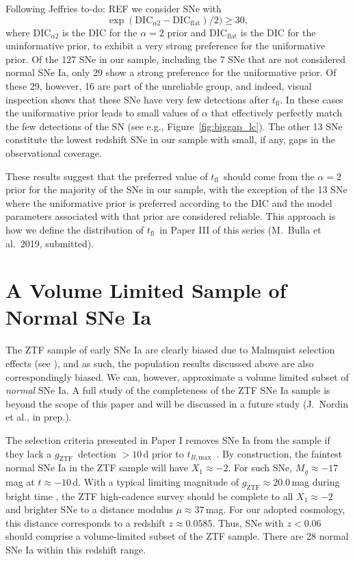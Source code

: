\documentclass[twocolumn]{./aastex63}
\newcommand{\todo}[1]{{\color{magenta} to-do: {#1}}}
\newcommand{\gztf}{$g_\mathrm{ZTF}$}
\newcommand{\tfl}{$t_\mathrm{fl}$}
\newcommand{\tbmax}{$t_{B,\mathrm{max}}$}
\begin{document}
Following Jeffries \todo{REF} we consider SNe with
%
$$\exp(\mathrm{DIC}_{\alpha2} - \mathrm{DIC}_\mathrm{flat})/2) \ge 30,$$
%
where $\mathrm{DIC}_{\alpha2}$ is the DIC for the $\alpha = 2$ prior and
$\mathrm{DIC}_\mathrm{flat}$ is the DIC for the uninformative prior, to
exhibit a very strong preference for the uniformative prior. Of the 127 SNe in
our sample, including the 7 SNe that are not considered normal SNe Ia, only 29
show a strong preference for the uniformative prior. Of these 29, however, 16
are part of the unreliable group, and indeed, visual inspection shows that
these SNe have very few detections after \tfl. In these cases the uniformative
prior leads to small values of $\alpha$ that effectively perfectly match the
few detections of the SN (see e.g., Figure~\ref{fig:biggap_lc}). The other 13
SNe constitute the lowest redshift SNe in our sample with small, if any, gaps
in the observational coverage.

These results suggest that the preferred value of \tfl\ should come from the
$\alpha = 2$ prior for the majority of the SNe in our sample, with the
exception of the 13 SNe where the uniformative prior is preferred according to
the DIC and the model parameters associated with that prior are considered
reliable. This approach is how we define the distribution of \tfl\ in Paper
III of this series (M.~Bulla et al.~2019, submitted).

\section{A Volume Limited Sample of Normal SNe Ia}\label{sec:volume_limited}

The ZTF sample of early SNe Ia are clearly biased due to Malmquist selection
effects (see \citealt{Yao19}), and as such, the population results discussed
above are also correspondingly biased. We can, however, approximate a volume
limited subset of \textit{normal} SNe Ia. A full study of the completeness of
the ZTF SNe Ia sample is beyond the scope of this paper and will be discussed
in a future study (J.~Nordin et al., in prep.).

The selection criteria presented in Paper I removes SNe Ia from the sample if
they lack a \gztf\ detection $> 10$\,d prior to \tbmax\ \citep{Yao19}. By
construction, the faintest normal SNe Ia in the ZTF sample will have $X_1
\approx -2$. For such SNe, $M_g \approx -17$\,mag at $t \approx -10$\,d. With a
typical limiting magnitude of \gztf$ \approx 20.0$\,mag during bright time
\citep{Bellm19}, the ZTF high-cadence survey should be complete to all $X_1
\approx -2$ and brighter SNe to a distance modulus $\mu \approx 37$\,mag. For
our adopted cosmology, this distance corresponds to a redshift $z \approx
0.0585$. Thus, SNe with $z < 0.06$ should comprise a volume-limited subset of
the ZTF sample. There are 28 normal SNe Ia within this redshift range.
\end{document}
